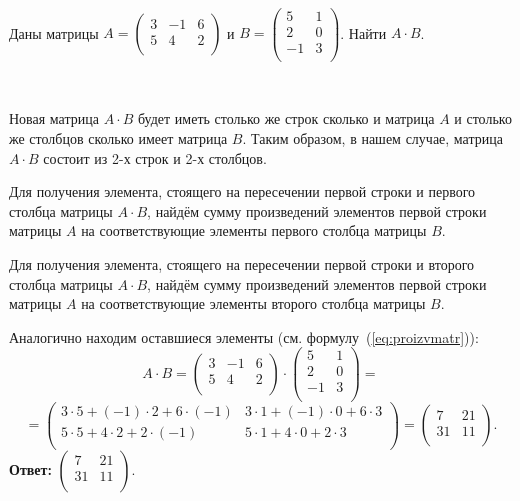 \documentclass[10pt]{article}
\numberwithin{primer}{section}
\numberwithin{equation}{section}
\begin{document}
\noindent{}\vspace*{-0.5cm}\\
Даны матрицы $A=\begin{pmatrix}
3 & -1 & 6\\
5 & 4 & 2\\
\end{pmatrix}$ и $B=\begin{pmatrix}
5 & 1\\
2 & 0\\
-1 & 3\\
\end{pmatrix}$. Найти $A\!\cdot\! B$.

\noindent{}\,\hrulefill\vspace{4pt}

Новая матрица $A\!\cdot\! B$ будет иметь столько же строк сколько и матрица $A$ и столько же столбцов сколько имеет матрица $B$.
Таким образом, в нашем случае, матрица $A\!\cdot\! B$ состоит из 2-х строк и 2-х столбцов.

Для получения элемента, стоящего на пересечении первой строки и первого столбца матрицы $A\!\cdot\! B$, найдём сумму произведений
элементов первой строки матрицы $A$ на соответствующие элементы первого столбца матрицы $B$.

Для получения элемента, стоящего на пересечении первой строки и второго столбца матрицы $A\!\cdot\! B$, найдём сумму произведений
элементов первой строки матрицы $A$ на соответствующие элементы второго столбца матрицы $B$.

Аналогично находим оставшиеся элементы (см. формулу~(\ref{eq:proizvmatr})):
\begin{equation*}
A\!\cdot\! B=\begin{pmatrix}
3 & -1 & 6\\
5 & 4 & 2\\
\end{pmatrix}\cdot\begin{pmatrix}
5 & 1\\
2 & 0\\
-1 & 3\\
\end{pmatrix}=
\end{equation*}
\begin{equation*}
=\begin{pmatrix}
3\cdot5+(-1)\cdot2+6\cdot(-1) & 3\cdot1+(-1)\cdot0+6\cdot3\\
5\cdot5+4\cdot2+2\cdot(-1) & 5\cdot1+4\cdot0+2\cdot3\\
\end{pmatrix}=\begin{pmatrix}
7 & 21\\
31 & 11\\
\end{pmatrix}.
\end{equation*}
\noindent\textbf{Ответ: }$\begin{pmatrix}
7 & 21\\
31 & 11\\
\end{pmatrix}$.\vspace{4pt}
\end{document}
